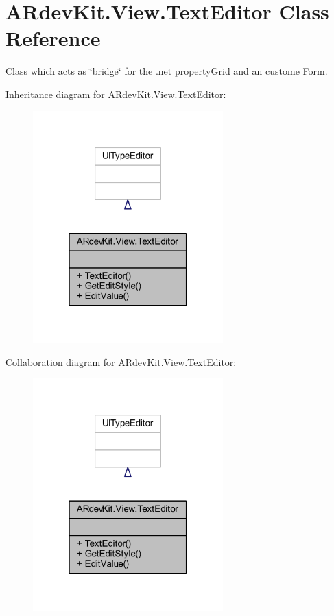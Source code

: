 \hypertarget{class_a_rdev_kit_1_1_view_1_1_text_editor}{\section{A\-Rdev\-Kit.\-View.\-Text\-Editor Class Reference}
\label{class_a_rdev_kit_1_1_view_1_1_text_editor}
}


Class which acts as \char`\"{}bridge\char`\"{} for the .net property\-Grid and an custome Form.  




Inheritance diagram for A\-Rdev\-Kit.\-View.\-Text\-Editor\-:
\nopagebreak
\begin{figure}[H]
\begin{center}
\leavevmode
\includegraphics[width=208pt]{class_a_rdev_kit_1_1_view_1_1_text_editor__inherit__graph}
\end{center}
\end{figure}


Collaboration diagram for A\-Rdev\-Kit.\-View.\-Text\-Editor\-:
\nopagebreak
\begin{figure}[H]
\begin{center}
\leavevmode
\includegraphics[width=208pt]{class_a_rdev_kit_1_1_view_1_1_text_editor__coll__graph}
\end{center}
\end{figure}
